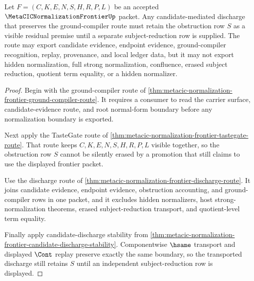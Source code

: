 \begin{theorem}
\label{thm:metacic-normalization-frontier-residual-premise-retention}
Let $F=(C,K,E,N,S,H,R,P,L)$ be an accepted $\MetaCICNormalizationFrontierUp$ packet. Any candidate-mediated discharge that preserves the ground-compiler route must retain the obstruction row $S$ as a visible residual premise until a separate subject-reduction row is supplied. The route may export candidate evidence, endpoint evidence, ground-compiler recognition, replay, provenance, and local ledger data, but it may not export hidden normalization, full strong normalization, confluence, erased subject reduction, quotient term equality, or a hidden normalizer.
\end{theorem}
\begin{proof}
Begin with the ground-compiler route of \autoref{thm:metacic-normalization-frontier-ground-compiler-route}. It requires a consumer to read the carrier surface, candidate-evidence route, and root normal-form boundary before any normalization boundary is exported.

Next apply the TasteGate route of \autoref{thm:metacic-normalization-frontier-tastegate-route}. That route keeps $C,K,E,N,S,H,R,P,L$ visible together, so the obstruction row $S$ cannot be silently erased by a promotion that still claims to use the displayed frontier packet.

Use the discharge route of \autoref{thm:metacic-normalization-frontier-discharge-route}. It joins candidate evidence, endpoint evidence, obstruction accounting, and ground-compiler rows in one packet, and it excludes hidden normalizers, host strong-normalization theorems, erased subject-reduction transport, and quotient-level term equality.

Finally apply candidate-discharge stability from \autoref{thm:metacic-normalization-frontier-candidate-discharge-stability}. Componentwise $\hsame$ transport and displayed $\Cont$ replay preserve exactly the same boundary, so the transported discharge still retains $S$ until an independent subject-reduction row is displayed.
\end{proof}

